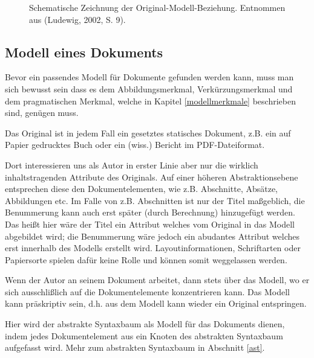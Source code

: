 \begin{figure}[h!]
\centering
\advance\leftskip-2.5cm
\caption{ Schematische Zeichnung der Original-Modell-Beziehung. Entnommen aus (Ludewig, 2002, S. 9). }\label{modell}
\end{figure}
 
\subsection{Modell eines Dokuments}\label{dokumentModell}
 
Bevor ein passendes Modell für Dokumente gefunden werden kann, muss man sich bewusst sein dass es dem Abbildungsmerkmal, Verkürzungsmerkmal und dem pragmatischen Merkmal, welche in Kapitel \ref{modellmerkmale} beschrieben sind, genügen muss.

 
Das Original ist in jedem Fall ein gesetztes statisches Dokument, z.B. ein auf Papier gedrucktes Buch oder ein (wiss.) Bericht im PDF-Dateiformat.

 
Dort interessieren uns als Autor in erster Linie aber nur die wirklich inhaltstragenden Attribute des Originals. Auf einer höheren Abstraktionsebene entsprechen diese den Dokumentelementen, wie z.B. Abschnitte, Absätze, Abbildungen etc. Im Falle von z.B. Abschnitten ist nur der Titel maßgeblich, die Benummerung kann auch erst später (durch Berechnung) hinzugefügt werden. Das heißt hier wäre der Titel ein Attribut welches vom Original in das Modell abgebildet wird; die Benummerung wäre jedoch ein abudantes Attribut welches erst innerhalb des Modells erstellt wird. Layoutinformationen, Schriftarten oder Papiersorte spielen dafür keine Rolle und können somit weggelassen werden.

 
Wenn der Autor an seinem Dokument arbeitet, dann stets über das Modell, wo er sich ausschlißlich auf die Dokumentelemente konzentrieren kann. Das Modell kann präskriptiv sein, d.h. aus dem Modell kann wieder ein Original entspringen.

 
Hier wird der abstrakte Syntaxbaum als Modell für das Dokuments dienen, indem jedes Dokumentelement aus ein Knoten des abstrakten Syntaxbaum aufgefasst wird. Mehr zum abstrakten Syntaxbaum in Abschnitt \ref{ast}.

